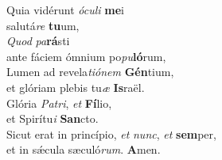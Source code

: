 \evenverse Quia vidérunt \textit{ó}\textit{cu}\textit{li} \textbf{me}i~\*\\
\evenverse salutá\textit{re} \textbf{tu}um,\\
\oddverse \textit{Quod} \textit{pa}\textbf{rá}sti~\*\\
\oddverse ante fáciem ómnium po\textit{pu}\textbf{ló}rum,\\
\evenverse Lumen ad revela\textit{ti}\textit{ó}\textit{nem} \textbf{Gén}tium,~\*\\
\evenverse et glóriam plebis tu\textit{æ} \textbf{Is}raël.\\
\oddverse Glória \textit{Pa}\textit{tri}, \textit{et} \textbf{Fí}lio,~\*\\
\oddverse et Spirítu\textit{i} \textbf{San}cto.\\
\evenverse Sicut erat in princípio, \textit{et} \textit{nunc}, \textit{et} \textbf{sem}per,~\*\\
\evenverse et in sǽcula sæculó\textit{rum}. \textbf{A}men.\\

